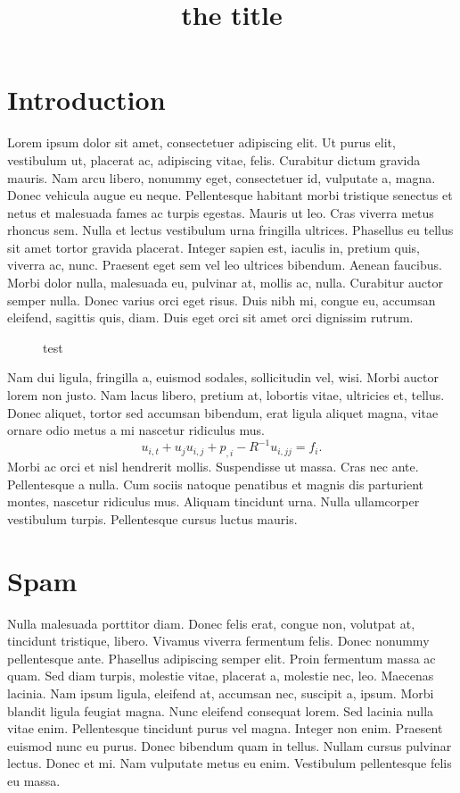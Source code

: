 \documentclass{tudelftposter}
\title{the title}
\begin{document}
\section{Introduction}

Lorem ipsum dolor sit amet, consectetuer adipiscing elit. Ut purus elit,
vestibulum ut, placerat ac, adipiscing vitae, felis. Curabitur dictum gravida
mauris. Nam arcu libero, nonummy eget, consectetuer id, vulputate a, magna.
Donec vehicula augue eu neque. Pellentesque habitant morbi tristique senectus et
netus et malesuada fames ac turpis egestas. Mauris ut leo. Cras viverra metus
rhoncus sem. Nulla et lectus vestibulum urna fringilla ultrices.  Phasellus eu
tellus sit amet tortor gravida placerat. Integer sapien est, iaculis in, pretium
quis, viverra ac, nunc. Praesent eget sem vel leo ultrices bibendum. Aenean
faucibus.  Morbi dolor nulla, malesuada eu, pulvinar at, mollis ac, nulla.
Curabitur auctor semper nulla. Donec varius orci eget risus. Duis nibh mi,
congue eu, accumsan eleifend, sagittis quis, diam. Duis eget orci sit amet orci
dignissim rutrum.

\begin{figure}[h]
  \centering
  \framebox{\rule{0pt}{5cm}\rule{5cm}{0pt}}
  \caption{test}
  \label{fig:test}
\end{figure}

Nam dui ligula, fringilla a, euismod sodales, sollicitudin vel, wisi. Morbi
auctor lorem non justo. Nam lacus libero, pretium at, lobortis vitae, ultricies
et, tellus. Donec aliquet, tortor sed accumsan bibendum, erat ligula aliquet
magna, vitae ornare odio metus a mi nascetur ridiculus mus.
\begin{equation}
  u_{i,t} + u_j u_{i,j} + p_{,i} - R^{-1} u_{i,jj} = f_i.
\end{equation}
Morbi ac orci et nisl hendrerit mollis.  Suspendisse ut massa. Cras nec ante.
Pellentesque a nulla.  Cum sociis natoque penatibus et magnis dis parturient
montes, nascetur ridiculus mus. Aliquam tincidunt urna. Nulla ullamcorper
vestibulum turpis. Pellentesque cursus luctus mauris.

\section{Spam}

Nulla malesuada porttitor diam. Donec felis erat, congue non, volutpat at,
tincidunt tristique, libero. Vivamus viverra fermentum felis. Donec nonummy
pellentesque ante. Phasellus adipiscing semper elit. Proin fermentum massa ac
quam. Sed diam turpis, molestie vitae, placerat a, molestie nec, leo. Maecenas
lacinia. Nam ipsum ligula, eleifend at, accumsan nec, suscipit a, ipsum.  Morbi
blandit ligula feugiat magna. Nunc eleifend consequat lorem. Sed lacinia nulla
vitae enim. Pellentesque tincidunt purus vel magna. Integer non enim. Praesent
euismod nunc eu purus. Donec bibendum quam in tellus. Nullam cursus pulvinar
lectus. Donec et mi.  Nam vulputate metus eu enim. Vestibulum pellentesque felis
eu massa.
\end{document}
